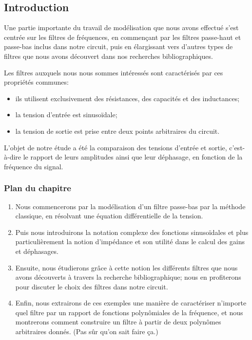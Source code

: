 \subsection*{Introduction}

Une partie importante du travail de modélisation que nous avons effectué
s'est centrée sur les filtres de fréquences,
en commençant par les filtres passe-haut et passe-bas inclus dans notre circuit,
puis en élargissant vers d'autres types de filtres que nous avons découvert
dans nos recherches bibliographiques.

Les filtres auxquels nous nous sommes intéressés sont caractérisés
par ces propriétés communes:
\begin{itemize}
    \item ils utilisent exclusivement des résistances,
        des capacités et des inductances;
    \item la tension d'entrée est sinusoïdale;
    \item la tension de sortie est prise entre deux points arbitraires
        du circuit.
\end{itemize}

L'objet de notre étude a été la comparaison des tensions d'entrée et sortie,
c'est-à-dire le rapport de leurs amplitudes ainsi que leur déphasage,
en fonction de la fréquence du signal.


\subsubsection*{Plan du chapitre}
\begin{enumerate}
    \item Nous commencerons par la modélisation
        d'un filtre passe-bas par la méthode classique, en résolvant une
        équation différentielle de la tension.
    \item Puis nous introduirons la notation complexe des fonctions sinusoïdales
        et plus particulièrement la notion d'impédance et son utilité
        dans le calcul des gains et déphasages.
    \item Ensuite, nous étudierons grâce à cette notion
        les différents filtres que nous avons découverts à travers
        la recherche bibliographique;
        nous en profiterons pour discuter
        le choix des filtres dans notre circuit.
    \item Enfin, nous extrairons de ces exemples une manière de caractériser
        n'importe quel filtre par un rapport de fonctions
        polynômiales de la fréquence, et nous montrerons comment construire
        un filtre à partir de deux polynômes arbitraires donnés.
        (Pas sûr qu'on sait faire ça.)
\end{enumerate}
